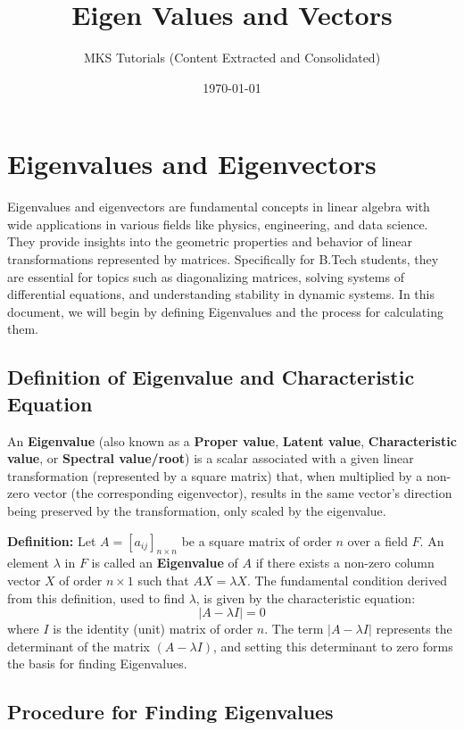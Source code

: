 \documentclass{article}
\title{Eigen Values and Vectors}
\author{MKS Tutorials (Content Extracted and Consolidated)}
\date{\today}
\begin{document}
\maketitle

\section{Eigenvalues and Eigenvectors} %

Eigenvalues and eigenvectors are fundamental concepts in linear algebra with wide applications in various fields like physics, engineering, and data science. They provide insights into the geometric properties and behavior of linear transformations represented by matrices. Specifically for B.Tech students, they are essential for topics such as diagonalizing matrices, solving systems of differential equations, and understanding stability in dynamic systems. In this document, we will begin by defining Eigenvalues and the process for calculating them.

\subsection{Definition of Eigenvalue and Characteristic Equation} %

An \textbf{Eigenvalue} (also known as a \textbf{Proper value}, \textbf{Latent value}, \textbf{Characteristic value}, or \textbf{Spectral value/root}) is a scalar associated with a given linear transformation (represented by a square matrix) that, when multiplied by a non-zero vector (the corresponding eigenvector), results in the same vector's direction being preserved by the transformation, only scaled by the eigenvalue.

\textbf{Definition:}
Let $A = [a_{ij}]_{n \times n}$ be a square matrix of order $n$ over a field $F$. An element $\lambda$ in $F$ is called an \textbf{Eigenvalue} of $A$ if there exists a non-zero column vector $X$ of order $n \times 1$ such that $AX = \lambda X$.
The fundamental condition derived from this definition, used to find $\lambda$, is given by the characteristic equation:
\[ |A - \lambda I| = 0 \]
where $I$ is the identity (unit) matrix of order $n$. The term $|A - \lambda I|$ represents the determinant of the matrix $(A - \lambda I)$, and setting this determinant to zero forms the basis for finding Eigenvalues.

\subsection{Procedure for Finding Eigenvalues} %
\end{document}
